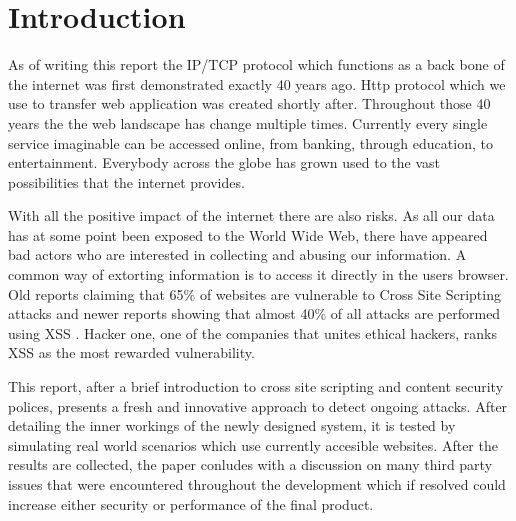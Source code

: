 \chapter{Introduction}

As of writing this report the IP/TCP protocol which functions as a back bone of the internet was first demonstrated exactly 40 years ago.
Http protocol which we use to transfer web application was created shortly after.
Throughout those 40 years the the web landscape has change multiple times.
Currently every single service imaginable can be accessed online, from banking, through education, to entertainment.
Everybody across the globe has grown used to the vast possibilities that the internet provides.

With all the positive impact of the internet there are also risks.
As all our data has at some point been exposed to the World Wide Web, there have appeared bad actors who are interested in collecting and abusing our information.
A common way of extorting information is to access it directly in the users browser.
Old reports claiming that 65\% of websites are vulnerable to Cross Site Scripting attacks \cite{xssEverywhere} and newer reports showing that almost 40\% of all attacks are performed using XSS \cite{xssEverywhere2}.
Hacker one, one of the companies that unites ethical hackers, ranks XSS as the most rewarded vulnerability.

This report, after a brief introduction to cross site scripting and content security polices, presents a fresh and innovative approach to detect ongoing attacks.
After detailing the inner workings of the newly designed system, it is tested by simulating real world scenarios which use currently accesible websites.
After the results are collected, the paper conludes with a discussion on many third party issues that were encountered throughout the development which if resolved could increase either security or performance of the final product.



